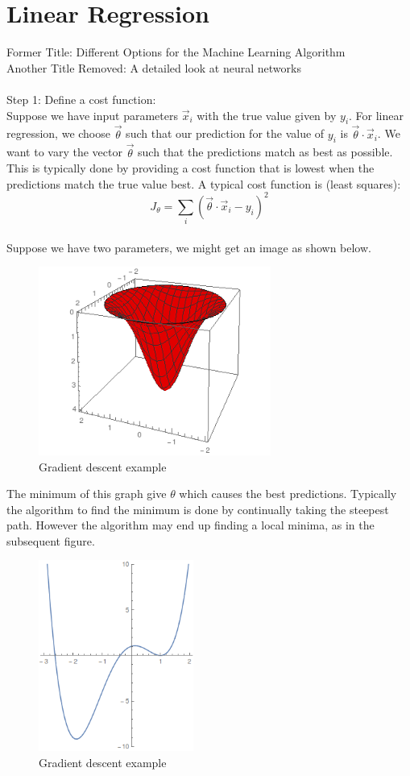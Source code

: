 \documentclass[a4paper,12pt]{report}
\begin{document}
\section{Linear Regression}
Former Title: Different Options for the Machine Learning Algorithm\\
Another Title Removed: A detailed look at neural networks\\
\\
Step 1: Define a cost function:\\
Suppose we have input parameters $\vec x_i$ with the true value given by $y_i$. For linear regression, we choose $\vec\theta$ such that our prediction for the value of $y_i$ is $\vec\theta \cdot \vec x_i$. We want to vary the vector $\vec \theta$ such that the predictions match as best as possible. This is typically done by providing a cost function that is lowest when the predictions match the true value best. A typical cost function is (least squares):
$$J_\theta = \sum_i \left(\vec\theta\cdot \vec x_i -y_i\right)^2 $$
\\
Suppose we have two parameters, we might get an image as shown below. 
\begin{figure}[h]
\centering
\includegraphics[width=3in]{GradDescent}
\caption{Gradient descent example}
\label{corr} 
\end{figure}
The minimum of this graph give $\theta$ which causes the best predictions. 
Typically the algorithm to find the minimum is done by continually taking the steepest path. However the algorithm may end up finding a local minima, as in the subsequent figure. 
\begin{figure}[h]
\centering
\includegraphics[width=2in]{localmin}
\caption{Gradient descent example}
\label{corr} 
\end{figure}
\end{document}
